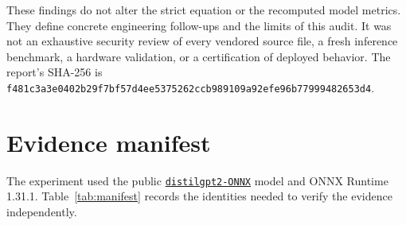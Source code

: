 \documentclass[11pt,a4paper]{article}
\begin{document}
These findings do not alter the strict equation or the recomputed model metrics. They define concrete engineering follow-ups and the limits of this audit. It was not an exhaustive security review of every vendored source file, a fresh inference benchmark, a hardware validation, or a certification of deployed behavior. The report's SHA-256 is \texttt{f481c3a3e0402b29f7bf57d4ee5375262ccb989109a92efe96b77999482653d4}.

\section{Evidence manifest}
The experiment used the public \href{https://huggingface.co/onnx-community/distilgpt2-ONNX}{\texttt{distilgpt2-ONNX}} model and ONNX Runtime 1.31.1. Table~\ref{tab:manifest} records the identities needed to verify the evidence independently.
\end{document}
